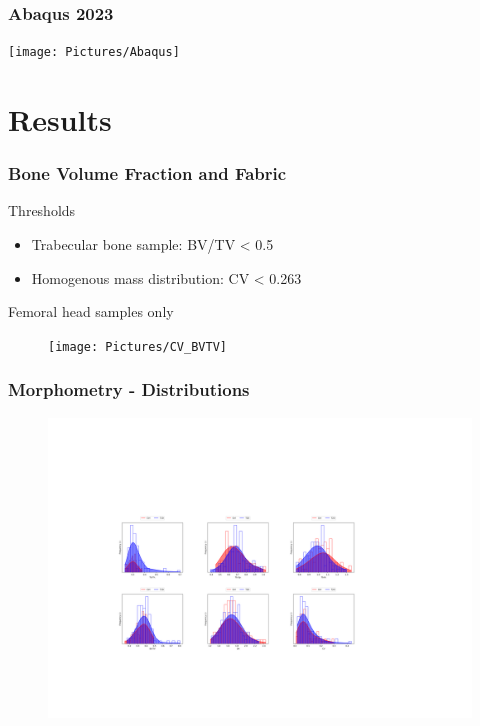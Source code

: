 \documentclass[xcolor=table,11pt]{beamer}
\begin{document}
	\begin{frame}
		\frametitle{Abaqus 2023}
		\texttt{[image: Pictures/Abaqus]}\\
	\end{frame}

	\section{Results}

	\begin{frame}
		\frametitle{Bone Volume Fraction and Fabric}
		Thresholds
		\begin{itemize}
			\item Trabecular bone sample: BV/TV < 0.5
			\item Homogenous mass distribution: CV < 0.263 \cite{p1}
		\end{itemize}
		Femoral head samples only
		\begin{figure}
			\centering
			\texttt{[image: Pictures/CV\_BVTV]}			
		\end{figure}

	\end{frame}

	\begin{frame}
		\frametitle{Morphometry - Distributions}
		\begin{figure}
			\centering
			\includegraphics[width=\linewidth, trim=100 0 100 0]{Pictures/Morphometry}			
		\end{figure}
	\end{frame}
\end{document}
